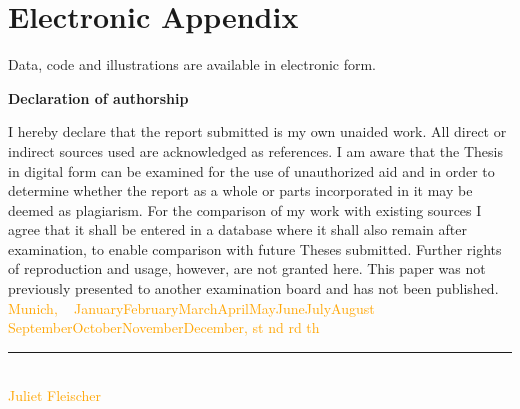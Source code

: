 \documentclass[12pt]{article}
\newcommand{\myname}{\large Juliet Fleischer}
\newcommand{\thesuffix}[1]{%
  \ifnum#1=1 st%
  \else\ifnum#1=2 nd%
  \else\ifnum#1=3 rd%
  \else th%
  \fi\fi\fi}
\newcommand{\mydate}{%
  ~\ifcase\month\or
  January\or February\or March\or April\or May\or June\or July\or August\or
  September\or October\or November\or December\fi, \the\day\thesuffix{\day} \number\year}
\begin{document}
\setcounter{page}{5} %

\appendix

% 

\section{Electronic Appendix}
\label{el_app}


Data, code and illustrations are available in electronic form. \bigskip

% 


\RaggedRight
% 
% 
\printbibliography
\newpage
\Large
\noindent
\textbf{Declaration of authorship} 
\vspace{0.5cm}
\noindent
\normalsize

I hereby declare that the report submitted is my own unaided work. All direct 
or indirect sources used are acknowledged as references. I am aware that the 
Thesis in digital form can be examined for the use of unauthorized aid and in 
order to determine whether the report as a whole or parts incorporated in it may 
be deemed as plagiarism. For the comparison of my work with existing sources I 
agree that it shall be entered in a database where it shall also remain after 
examination, to enable comparison with future Theses submitted. Further rights 
of reproduction and usage, however, are not granted here. This paper was not 
previously presented to another examination board and has not been published.
\\

\vspace{1cm}
\textcolor{orange}{Munich, \mydate} \\

\vspace{3cm}

\noindent\rule{0.5\textwidth}{0.4pt} \\

\textcolor{orange}{\myname}
\end{document}
